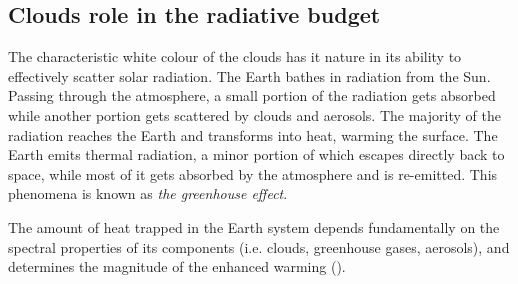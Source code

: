 
\subsection{Clouds role in the radiative budget}
The characteristic white colour of the clouds has it nature in its ability to  effectively scatter solar radiation. %
The Earth bathes in radiation from the Sun. Passing through the atmosphere, a small portion of the radiation gets absorbed while another portion gets scattered by clouds and aerosols. The majority of the radiation reaches the Earth and transforms into heat, warming the surface. The Earth emits thermal radiation, a minor portion of which escapes directly back to space, while most of it gets absorbed by the atmosphere and is re-emitted. This phenomena is known as \textit{the greenhouse effect}. 

The amount of heat trapped in the Earth system depends fundamentally on the spectral properties of its components (i.e. clouds, greenhouse gases, aerosols), and determines the magnitude of the enhanced warming (\cite{greenhouse_effect}).


